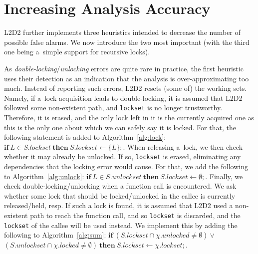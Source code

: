 \documentclass[runningheads]{llncs}
\newcommand{\LLDD}{\textsc{L2D2}\xspace} %
\newcommand{\mOne}{\texttt{mode\,1}\xspace}
\newcommand{\mTwo}{\texttt{mode\,2}\xspace}
\begin{document}
\vspace*{-2mm}\section{Increasing Analysis Accuracy}\vspace*{-2mm}
\label{sec:heuristics}

\LLDD further implements three heuristics intended to decrease the number of
possible false alarms. We now introduce the two most important (with the third
one being a~simple support for recursive locks).

As \emph{double-locking}/\emph{unlocking} errors are quite rare in practice, the
first heuristic uses their detection as an indication that the analysis is
over-approximating too much. Instead of reporting such errors, \LLDD resets
(some of) the working sets.
%
%
Namely, if a~lock acquisition leads to double-locking, it is assumed that \LLDD
followed some non-existent path, and \texttt{lockset} is no longer trustworthy.
Therefore, it is erased, and the only lock left in it is the currently acquired
one as this is the only one about which we can safely say it is locked. For
that, the following statement is added to Algorithm~\ref{alg:lock}: $\mathbf{if}
\ L \in S.lockset \ \mathbf{then} \ S.lockset \gets \{L\};$.
%
When releasing a~lock, we then check whether it may already be unlocked. If so,
\texttt{lockset} is erased, eliminating any dependencies that the locking error
would cause. For that, we add the following to Algorithm~\ref{alg:unlock}:
$\mathbf{if} \ L \in S.unlockset \ \mathbf{then} \ S.lockset \gets \emptyset;$.
%
Finally, we check double-locking/unlocking when a function call is encountered.
We ask whether some lock that should be locked/unlocked in the callee is
currently released/held, resp. If such a lock is found, it is assumed that \LLDD
used a non-existent path to reach the function call, and so \texttt{lockset} is
discarded, and the \texttt{lockset} of the callee will be used instead. We
implement this by adding the following to Algorithm~\ref{alg:sum}: $\mathbf{if}
\ (S.lockset \cap \chi.unlocked \neq \emptyset) \vee$ $(S.unlockset \cap
\chi.locked \neq \emptyset) \ \mathbf{then} \ S.lockset \gets \chi.lockset;$.
\end{document}

